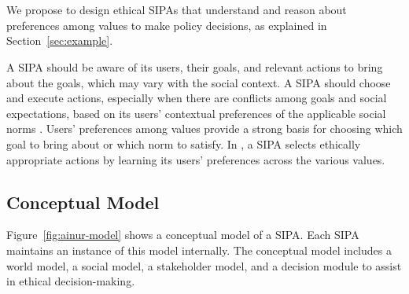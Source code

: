 \section{\frameworkAinur}
\label{sec:method}

We propose \frameworkAinur to design ethical SIPAs that understand and reason about preferences among values to make policy decisions, as explained in Section~\ref{sec:example}.

A SIPA should be aware of its users, their goals, and relevant
actions to bring about the goals, which may vary with the social
context. A SIPA should choose and execute actions, especially when
there are conflicts among goals and social expectations, based on
its users' contextual preferences of the applicable social norms
\citep{Ajmeri-AAMAS17-Arnor}. Users' preferences among values
provide a strong basis for choosing which goal to bring about or which
norm to satisfy. In \frameworkAinur, a SIPA selects ethically appropriate
actions by learning its users' preferences across the various
values.

\subsection{Conceptual Model}

Figure~\ref{fig:ainur-model} shows a conceptual model of a \frameworkAinur SIPA. 
Each SIPA maintains an instance of this model internally. 
The conceptual model includes a world model, a social model, 
a stakeholder model, and a decision module to assist in 
ethical decision-making. 


